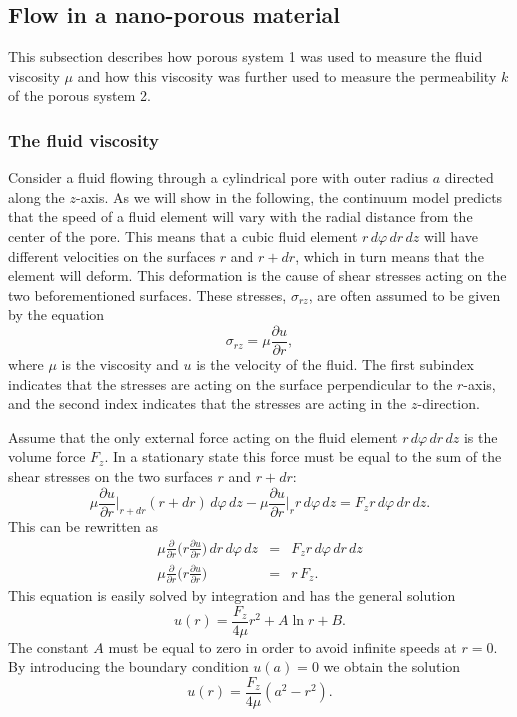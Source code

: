 \documentclass[12pt]{article}
\newcommand{\bdi}{\begin{displaymath}}
\newcommand{\edi}{\end{displaymath}}
\begin{document}
\subsection{Flow in a nano-porous material}
This subsection describes how porous system 1 was used to measure the fluid viscosity $\mu$ and how this viscosity was further used to measure the permeability $k$ of the porous system 2.

\subsubsection{The fluid viscosity}
Consider a fluid flowing through a cylindrical pore with outer radius $a$ directed along the $z$-axis.
As we will show in the following, the continuum model predicts that the speed of a fluid element will vary with the radial distance from the center of the pore.
This means that a cubic fluid element $r\,d\varphi\, dr\, dz$ will have different velocities on the surfaces $r$ and $r+dr$, which in turn means that the element will deform. This deformation is the cause of shear
stresses acting on the two beforementioned surfaces. These stresses, $\sigma_{rz}$, are often assumed to be given by the equation
\bdi
\sigma_{rz} = \mu\frac{\partial u}{\partial r},
\edi
where $\mu$ is the viscosity and $u$ is the velocity of the fluid.
The first subindex indicates that the stresses are acting on the surface perpendicular to the $r$-axis, and the second index indicates that the
stresses are acting in the $z$-direction.

Assume that the only external force acting on the fluid element $r\,d\varphi\, dr\, dz$ is the volume force $F_z$. In a stationary state this force must be equal to the sum of the shear stresses on the two surfaces $r$ and $r+dr$:
\bdi
\mu\frac{\partial u}{\partial r}\Big|_{r+dr}(r+dr)\,d\varphi\,dz - \mu\frac{\partial u}{\partial r}\Big|_r r\,d\varphi\,dz = F_zr\,d\varphi\, dr\, dz.
\edi
This can be rewritten as
\begin{eqnarray*}
 \mu\frac{\partial}{\partial r}\Big(r\frac{\partial u}{\partial r}\Big)\,dr\,d\varphi\,dz & = & F_zr\,d\varphi\,dr\,dz \\
 \mu\frac{\partial}{\partial r}\Big(r\frac{\partial u}{\partial r}\Big) & = & r\,F_z.
\end{eqnarray*}
This equation is easily solved by integration and has the general solution
\bdi
u(r) = \frac{F_z}{4\mu}r^2 + A\ln r + B.
\edi
The constant $A$ must be equal to zero in order to avoid infinite speeds at $r = 0$. By introducing the boundary condition $u(a) = 0$ we obtain the solution
\bdi
u(r) = \frac{F_z}{4\mu}(a^2 - r^2).
\edi
\end{document}
